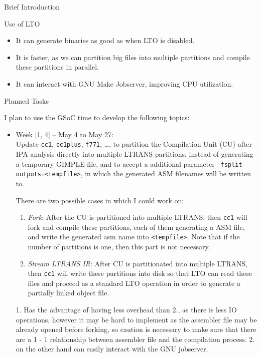 \begin{section}{Brief Introduction}
\begin{section}{Use of LTO}
\begin{itemize}

    \item It can generate binaries as good as when LTO is disabled.
    \item It is faster, as we can partition big files into multiple partitions
    and compile these partitions in parallel.
    \item It can interact with GNU Make Jobserver, improving CPU utilization.

\end{itemize}

\end{section}

\begin{section}{Planned Tasks}

I plan to use the GSoC time to develop the following topics:

\begin{itemize}
 \item{Week [1, 4] -- May 4 to May 27:} \\
  Update \texttt{cc1}, \texttt{cc1plus}, \texttt{f771}, \ldots, to partition
  the Compilation Unit (CU) after IPA analysis directly into multiple LTRANS
  partitions, instead of generating a temporary GIMPLE file, and to accept a
  additional parameter \texttt{-fsplit-outputs=<tempfile>}, in which the
  generated ASM filenames will be written to.

  There are two possible cases in which I could work on:
  \begin{enumerate}
    \item \textit{Fork}: After the CU is partitioned into multiple LTRANS, then
    \texttt{cc1} will fork and compile these partitions, each of them
    generating a ASM file, and write the generated asm name into
    \texttt{<tempfile>}.  Note that if the number of partitions is one, then
    this part is not necessary.

    \item \textit{Stream LTRANS IR}: After CU is partitionated into multiple
    LTRANS, then \texttt{cc1} will write these partitions into disk so that LTO
    can read these files and proceed as a standard LTO operation in order to
    generate a partially linked object file.
  \end{enumerate}

  1. Has the advantage of having less overhead than 2., as there is less IO operations,
  however it may be hard to implement as the assembler file may be already
  opened before forking, so caution is necessary to make sure that there are a
  1 - 1 relationship between assembler file and the compilation process. 2.
  on the other hand can easily interact with the GNU jobserver.


\end{itemize}
\end{section}
\end{section}
